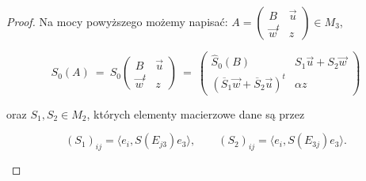 {\begin{proof}
Na mocy powyższego możemy napisać:
$A  =   \left( \begin{smallmatrix}
    B & \vec{u} \\
    \vec{w}^{t} & z
    \end{smallmatrix} \right) \in M_{3}$,
\begin{linenomath*}
 \begin{equation}
    S_{0}(A) \:=\: S_{0} \begin{pmatrix}
    B & \vec{u} \\
    \vec{w}^{t} & z
    \end{pmatrix} \: = \:
    \begin{pmatrix}
        \hat{S}_{0}(B) & S_{1} \vec{u} + S_{2} \vec{w} \\
        (\overline{S}_{1} \vec{w} + \overline{S}_{2} \vec{u})^{t} & \alpha z
    \end{pmatrix}
 \end{equation}
\end{linenomath*}
oraz  $S_{1}, S_{2} \in M_{2}$, których elementy macierzowe dane są przez
\begin{linenomath*}
 \begin{equation}
(S_{1})_{ij} = \langle e_{i}, S(E_{j3}) e_{3} \rangle, \quad \quad
(S_{2})_{ij} = \langle e_{i}, S(E_{3j}) e_{3} \rangle.
 \end{equation}
\end{linenomath*}


\end{proof}}
